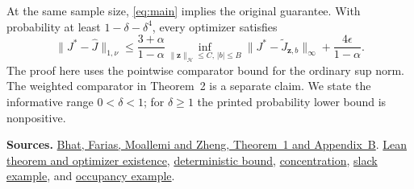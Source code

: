\documentclass[12pt,a4paper]{article}
\begin{document}
At the same sample size, \eqref{eq:main} implies the original guarantee. With probability at least \(1-\delta-\delta^4\), every optimizer satisfies
\begin{equation}
 \|J^*-\widehat J\|_{1,\nu}
 \le \frac{3+\alpha}{1-\alpha}
       \inf_{\|\mathbf z\|_{\mathcal H}\le C,\,|b|\le B}
       \|J^*-\widetilde J_{\mathbf z,b}\|_\infty+\frac{4\epsilon}{1-\alpha}.
 \tag{19}
\end{equation} The proof here uses the pointwise comparator
bound for the ordinary sup norm. The weighted comparator in Theorem~2
is a separate claim. We state the informative range \(0<\delta<1\);
for \(\delta\ge1\) the printed probability lower bound is nonpositive.

{\small
\textbf{Sources.}
\href{https://moallemi.com/ciamac/papers/kernel-adp-2012.pdf\#page=13}{Bhat, Farias, Moallemi and Zheng, Theorem~1 and Appendix~B}.
\href{https://github.com/nikhilpb/kadp/blob/main/lean/Theorem1.lean}{Lean theorem and optimizer existence},
\href{https://github.com/nikhilpb/kadp/blob/main/lean/Approximation.lean}{deterministic bound},
\href{https://github.com/nikhilpb/kadp/blob/main/lean/UniformDeviation.lean}{concentration},
\href{https://github.com/nikhilpb/kadp/blob/main/lean/Examples/Theorem1.lean}{slack example},
and \href{https://github.com/nikhilpb/kadp/blob/main/lean/Examples/Occupancy.lean}{occupancy example}.}
\end{document}

